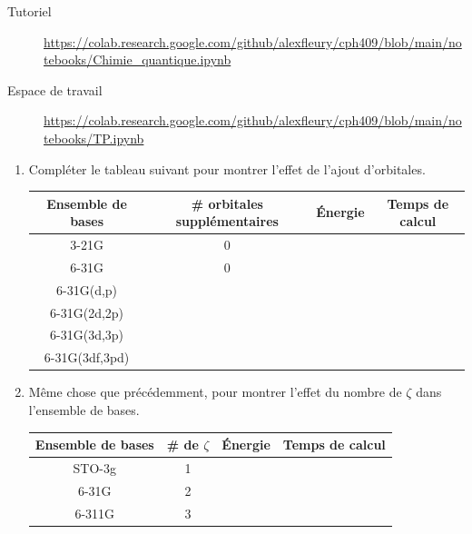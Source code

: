 \documentclass[12pt,letterpaper]{article}
\begin{document}
\begin{description}
\item[Tutoriel] \url{https://colab.research.google.com/github/alexfleury/cph409/blob/main/notebooks/Chimie_quantique.ipynb}
\item[Espace de travail] \url{https://colab.research.google.com/github/alexfleury/cph409/blob/main/notebooks/TP.ipynb}
\end{description}

\begin{enumerate}[resume]
\item Compléter le tableau suivant pour montrer l'effet de l'ajout d'orbitales.
\begin{center}
  \begin{tabular}{cccc}
      \toprule
      Ensemble de bases & \# orbitales supplémentaires & Énergie & Temps de calcul \\
      \midrule
      3-21G & 0 & & \\
      6-31G & 0 & & \\
      6-31G(d,p) &  & & \\
      6-31G(2d,2p) &  & & \\
      6-31G(3d,3p) &  & & \\
      6-31G(3df,3pd) &  & & \\
      \bottomrule
  \end{tabular}
\end{center}

\item Même chose que précédemment, pour montrer l'effet du nombre de $\zeta$ dans l'ensemble de bases.
\begin{center}
  \begin{tabular}{cccc}
    \toprule
    Ensemble de bases & \# de $\zeta$ & Énergie & Temps de calcul \\
    \midrule
    STO-3g & 1 & & \\
    6-31G & 2 & & \\
    6-311G & 3 & & \\
    \bottomrule
  \end{tabular}
\end{center}


\end{enumerate}
\end{document}
